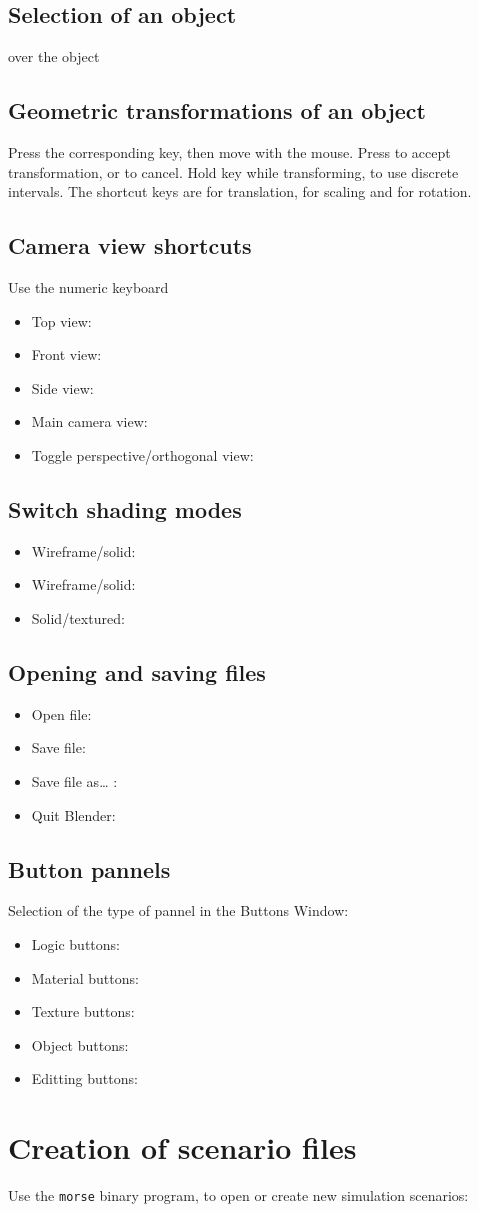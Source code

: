 \documentclass[twoside,a4paper,10pt]{report}
\newcommand{\dokutitleleveltwo}[1]{\section{#1}}
\newcommand{\dokutitleleveltree}[1]{\subsection{#1}}
\newcommand{\dokumonospace}[1]{\texttt{#1}}
\newcommand{\dokuitem}{\item}
\begin{document}
\dokutitleleveltree{Selection of an object}
\label{d461f4bc8beb6b0a8442d6d4da3a0c6d}%
 over the object


\dokutitleleveltree{Geometric transformations of an object}
\label{001ad77ecf37a2b719f6d1a347faed00}%
Press the corresponding key, then move with the mouse.
Press  to accept transformation, or  to cancel. Hold 
 key while transforming, to use discrete intervals. The shortcut 
keys are  for translation,  for scaling and 
 for rotation.


\dokutitleleveltree{Camera view shortcuts}
\label{490b5cdd607bc3b8891df904de25d417}%
Use the numeric keyboard


\begin{itemize}
\dokuitem  Top view: 
\dokuitem  Front view: 
\dokuitem  Side view: 
\dokuitem  Main camera view: 
\dokuitem  Toggle perspective/orthogonal view: 
\end{itemize}

\dokutitleleveltree{Switch shading modes}
\label{930ca388b865b6b10e3f5eb29f9bb084}%

\begin{itemize}
\dokuitem  Wireframe/solid: 
\dokuitem  Wireframe/solid: 
\dokuitem  Solid/textured: 
\end{itemize}

\dokutitleleveltree{Opening and saving files}
\label{0b2dd5c17c378b3048db1b45587a2d17}%

\begin{itemize}
\dokuitem  Open file: 
\dokuitem  Save file: 
\dokuitem  Save file as\ldots{} : 
\dokuitem  Quit Blender: 
\end{itemize}

\dokutitleleveltree{Button pannels}
\label{ec1467299d35fb7adfeb7b88dce3d414}%
Selection of the type of pannel in the Buttons Window:


\begin{itemize}
\dokuitem  Logic buttons: 
\dokuitem  Material buttons: 
\dokuitem  Texture buttons: 
\dokuitem  Object buttons: 
\dokuitem  Editting buttons: 
\end{itemize}

\dokutitleleveltwo{Creation of scenario files}
\label{477e85464263e092bdd386389bab76b2}%

Use the \dokumonospace{morse} binary program, to open or create new simulation scenarios:
\end{document}

